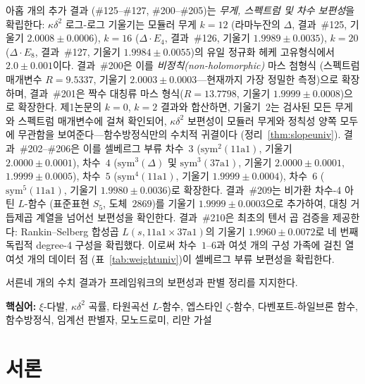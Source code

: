 \documentclass[11pt, a4paper]{article}
\theoremstyle{plain}
\theoremstyle{definition}
\begin{document}
\begin{tcolorbox}[
  colback=lightbg, colframe=zetaviolet!60!black,
  title={\bfseries 초록}, fonttitle=\large,
  arc=3pt, boxrule=0.8pt, toptitle=3pt, bottomtitle=3pt
]
\smallskip
\noindent 아홉 개의 추가 결과 (\#125--\#127, \#200--\#205)는
\emph{무게, 스펙트럼 및 차수 보편성}을 확립한다:
$\kappa\delta^{2}$ 로그-로그 기울기는 모듈러 무게 $k=12$
(라마누잔의 $\Delta$, 결과~\#125, 기울기 $2.0008\pm 0.0006$),
$k=16$ ($\Delta\cdot E_4$, 결과~\#126, 기울기 $1.9989\pm 0.0035$),
$k=20$ ($\Delta\cdot E_8$, 결과~\#127, 기울기 $1.9984\pm 0.0055$)의
유일 정규화 헤케 고유형식에서 $2.0\pm 0.001$이다.
결과~\#200은 이를 \emph{비정칙(non-holomorphic)} 마스 첨형식
(스펙트럼 매개변수 $R=9.5337$, 기울기 $2.0003\pm 0.0003$---현재까지
가장 정밀한 측정)으로 확장하며,
결과~\#201은 짝수 대칭류 마스 형식($R=13.7798$, 기울기 $1.9999\pm 0.0008$)으로 확장한다.
제1논문의 $k=0$, $k=2$ 결과와 합산하면,
기울기~$2$는 검사된 모든 무게와 스펙트럼 매개변수에 걸쳐 확인되어,
$\kappa\delta^{2}$ 보편성이 모듈러 무게와 정칙성 양쪽 모두에
무관함을 보여준다---함수방정식만의 수치적 귀결이다 (정리~\ref{thm:slopeuniv}).
결과~\#202--\#206은 이를 셀베르그 부류 차수~$3$
($\mathrm{sym}^{2}(\text{11a1})$, 기울기 $2.0000\pm 0.0001$),
차수~$4$ ($\mathrm{sym}^{3}(\Delta)$ 및 $\mathrm{sym}^{3}(\text{37a1})$,
기울기 $2.0000\pm 0.0001$, $1.9999\pm 0.0005$),
차수~$5$ ($\mathrm{sym}^{4}(\text{11a1})$, 기울기 $1.9999\pm 0.0004$),
차수~$6$ ($\mathrm{sym}^{5}(\text{11a1})$, 기울기 $1.9980\pm 0.0036$)로
확장한다.
결과~\#209는 비가환 차수-4 아틴 $L$-함수
(표준표현 $S_5$, 도체~$2869$)를 기울기 $1.9999\pm 0.0003$으로 추가하여,
대칭 거듭제곱 계열을 넘어선 보편성을 확인한다.
결과~\#210은 최초의 텐서 곱 검증을 제공한다:
Rankin--Selberg 합성곱 $L(s, \text{11a1}\times\text{37a1})$의
기울기 $1.9960\pm 0.0072$로 네 번째 독립적 degree-4 구성을 확립했다.
이로써 차수~$1$--$6$과 여섯 개의 구성 가족에 걸친 열여섯 개의 데이터 점
(표~\ref{tab:weightuniv})이 셀베르그 부류 보편성을 확립한다.

\smallskip
\noindent 서른네 개의 수치 결과가 프레임워크의 보편성과
판별 정리를 지지한다.
\end{tcolorbox}

\vspace{0.5em}
\noindent\textbf{핵심어:} $\xi$-다발, $\kappa\delta^{2}$ 곡률,
타원곡선 $L$-함수, 엡스타인 $\zeta$-함수, 다벤포트-하일브론 함수,
함수방정식, 임계선 판별자, 모노드로미, 리만 가설

\tableofcontents
\newpage


\section{서론}
\label{sec:intro}
\end{document}
